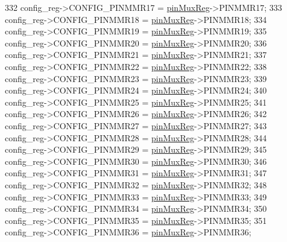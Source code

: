 \begin{DoxyCode}
332         config\_reg->CONFIG\_PINMMR17 = \mbox{\hyperlink{reg__pinmux_8h_a489be2306394971fc7586946f88d6380}{pinMuxReg}}->PINMMR17;
333         config\_reg->CONFIG\_PINMMR18 = \mbox{\hyperlink{reg__pinmux_8h_a489be2306394971fc7586946f88d6380}{pinMuxReg}}->PINMMR18;
334         config\_reg->CONFIG\_PINMMR19 = \mbox{\hyperlink{reg__pinmux_8h_a489be2306394971fc7586946f88d6380}{pinMuxReg}}->PINMMR19;
335         config\_reg->CONFIG\_PINMMR20 = \mbox{\hyperlink{reg__pinmux_8h_a489be2306394971fc7586946f88d6380}{pinMuxReg}}->PINMMR20;
336         config\_reg->CONFIG\_PINMMR21 = \mbox{\hyperlink{reg__pinmux_8h_a489be2306394971fc7586946f88d6380}{pinMuxReg}}->PINMMR21;
337         config\_reg->CONFIG\_PINMMR22 = \mbox{\hyperlink{reg__pinmux_8h_a489be2306394971fc7586946f88d6380}{pinMuxReg}}->PINMMR22;
338         config\_reg->CONFIG\_PINMMR23 = \mbox{\hyperlink{reg__pinmux_8h_a489be2306394971fc7586946f88d6380}{pinMuxReg}}->PINMMR23;
339         config\_reg->CONFIG\_PINMMR24 = \mbox{\hyperlink{reg__pinmux_8h_a489be2306394971fc7586946f88d6380}{pinMuxReg}}->PINMMR24;
340         config\_reg->CONFIG\_PINMMR25 = \mbox{\hyperlink{reg__pinmux_8h_a489be2306394971fc7586946f88d6380}{pinMuxReg}}->PINMMR25;
341         config\_reg->CONFIG\_PINMMR26 = \mbox{\hyperlink{reg__pinmux_8h_a489be2306394971fc7586946f88d6380}{pinMuxReg}}->PINMMR26;
342         config\_reg->CONFIG\_PINMMR27 = \mbox{\hyperlink{reg__pinmux_8h_a489be2306394971fc7586946f88d6380}{pinMuxReg}}->PINMMR27;
343         config\_reg->CONFIG\_PINMMR28 = \mbox{\hyperlink{reg__pinmux_8h_a489be2306394971fc7586946f88d6380}{pinMuxReg}}->PINMMR28;
344         config\_reg->CONFIG\_PINMMR29 = \mbox{\hyperlink{reg__pinmux_8h_a489be2306394971fc7586946f88d6380}{pinMuxReg}}->PINMMR29;
345         config\_reg->CONFIG\_PINMMR30 = \mbox{\hyperlink{reg__pinmux_8h_a489be2306394971fc7586946f88d6380}{pinMuxReg}}->PINMMR30;
346         config\_reg->CONFIG\_PINMMR31 = \mbox{\hyperlink{reg__pinmux_8h_a489be2306394971fc7586946f88d6380}{pinMuxReg}}->PINMMR31;
347         config\_reg->CONFIG\_PINMMR32 = \mbox{\hyperlink{reg__pinmux_8h_a489be2306394971fc7586946f88d6380}{pinMuxReg}}->PINMMR32;
348         config\_reg->CONFIG\_PINMMR33 = \mbox{\hyperlink{reg__pinmux_8h_a489be2306394971fc7586946f88d6380}{pinMuxReg}}->PINMMR33;
349         config\_reg->CONFIG\_PINMMR34 = \mbox{\hyperlink{reg__pinmux_8h_a489be2306394971fc7586946f88d6380}{pinMuxReg}}->PINMMR34;
350         config\_reg->CONFIG\_PINMMR35 = \mbox{\hyperlink{reg__pinmux_8h_a489be2306394971fc7586946f88d6380}{pinMuxReg}}->PINMMR35;
351         config\_reg->CONFIG\_PINMMR36 = \mbox{\hyperlink{reg__pinmux_8h_a489be2306394971fc7586946f88d6380}{pinMuxReg}}->PINMMR36;

\end{DoxyCode}
